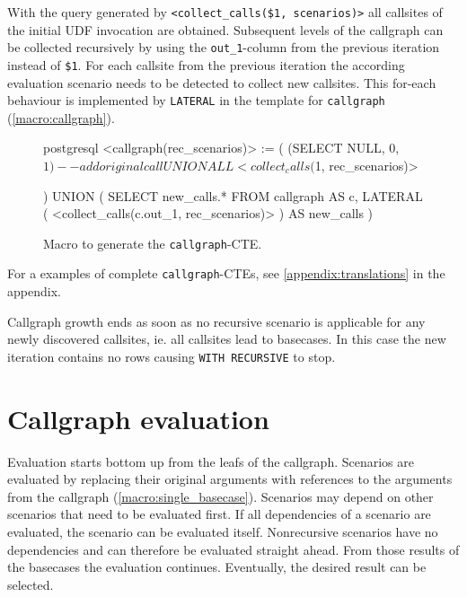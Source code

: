 With the query generated by \texttt{<collect\_calls(\$1, scenarios)>} all callsites of the initial UDF invocation are obtained. Subsequent levels of the callgraph can be collected recursively by using the \texttt{out\_1}-column from the previous iteration instead of \texttt{\$1}. For each callsite from the previous iteration the according evaluation scenario needs to be detected to collect new callsites. This for-each behaviour is implemented by \texttt{LATERAL} in the template for \texttt{callgraph} (\autoref{macro:callgraph}).

\begin{figure}[h!]\centering
\begin{cminted}{postgresql}
<callgraph(rec_scenarios)> :=
  (
    (SELECT NULL, 0, $1) -- add original call
      UNION ALL
    <collect_calls($1, rec_scenarios)> 

  ) UNION (
    SELECT
      new_calls.*
    FROM
      callgraph AS c, LATERAL (
        <collect_calls(c.out_1, rec_scenarios)>
      ) AS new_calls
  )
\end{cminted}
  \caption{Macro to generate the \texttt{callgraph}-CTE.}
  \label{macro:callgraph}
\end{figure}


\iffalse
\begin{figure}[h!]
    \centering
    
    \caption{Structure of the callstack CTE. In the beginning, the original parameters \$1 are used. The recursive step iterates over all newly discovered calls.}
    \label{discovery_strucutre}
\end{figure}
\fi

For a examples of complete \texttt{callgraph}-CTEs, see \autoref{appendix:translations} in the appendix.

Callgraph growth ends as soon as no recursive scenario is applicable for any newly discovered callsites, ie. all callsites lead to basecases. In this case the new iteration contains no rows causing \texttt{WITH RECURSIVE} to stop.

\section{Callgraph evaluation}
Evaluation starts bottom up from the leafs of the callgraph. Scenarios are evaluated by replacing their original arguments with references to the arguments from the callgraph (\autoref{macro:single_basecase}). Scenarios may depend on other scenarios that need to be evaluated first. If all dependencies of a scenario are evaluated, the scenario can be evaluated itself. Nonrecursive scenarios have no dependencies and can therefore be evaluated straight ahead. From those results of the basecases the evaluation continues. Eventually, the desired result can be selected.

